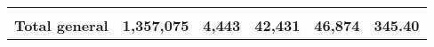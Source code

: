 \begin{tabular}{lrcclr}
	& \multicolumn{1}{l}{}                                           & \multicolumn{1}{l}{}                                       & \multicolumn{1}{l}{} &                                                                     & \multicolumn{1}{l}{}                                                         \\
	\rowcolor[HTML]{DDEBF7} 
	\textbf{Total   general}                                       & \textbf{1,357,075}                                             & \multicolumn{1}{r}{\cellcolor[HTML]{DDEBF7}\textbf{4,443}} & \textbf{42,431}      & \textbf{46,874}                                                     & \textbf{345.40}                                                             
\end{tabular}